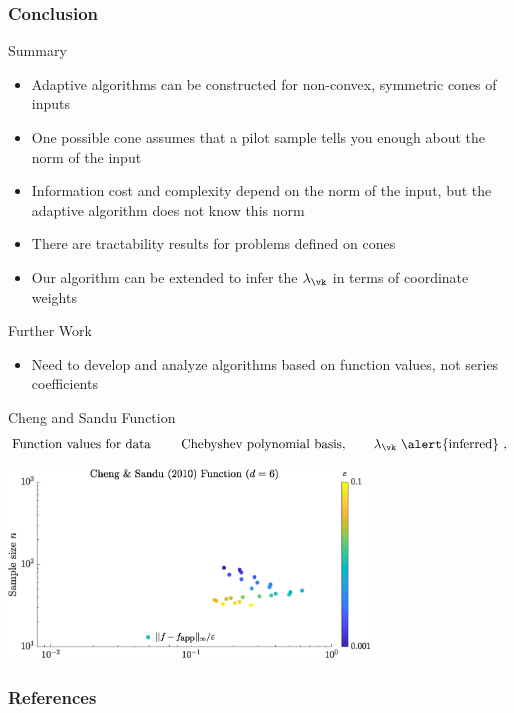\documentclass[10pt,compress,xcolor={usenames,dvipsnames},aspectratio=169]{beamer}
\begin{document}
\begin{frame}
	\frametitle{Conclusion}
	
	\vspace{-4ex}
	
	\alert{Summary}
	
	\vspace{-3ex}
	\begin{itemize}
		\item Adaptive algorithms can be constructed for non-convex, symmetric cones of inputs
		
		\item One possible cone assumes that a pilot sample tells you enough about the norm of the input
		
		\item Information cost and complexity depend on the norm of the input, but the adaptive algorithm does not  know this norm
		
		\item There are tractability results for problems defined on cones
		
		\item Our algorithm can be extended to infer the $\lambda_{\vk}$ in terms of coordinate weights
	\end{itemize}

\alert{Further Work}

	\vspace{-3ex}
	\begin{itemize}
	\item Need to develop and analyze algorithms based on function values, not series coefficients
	
\end{itemize}


\end{frame}

\begin{frame}{Cheng and Sandu Function}
	\vspace{-9ex}
	\begin{gather*}
	\text{Function values for data \qquad Chebyshev polynomial basis}, \qquad \lambda_{\vk} \text{ \alert{inferred} }, 
	\end{gather*}
	
	
	\centerline{\includegraphics[height = 5cm]{ProgramsImages/sim_eval_results_chsan10_d6_sflg0ErrN.eps}}
	
\end{frame}





\thankyouframe

\begin{frame}[allowframebreaks]
	\frametitle{References}
\printbibliography
\end{frame}
\end{document}
